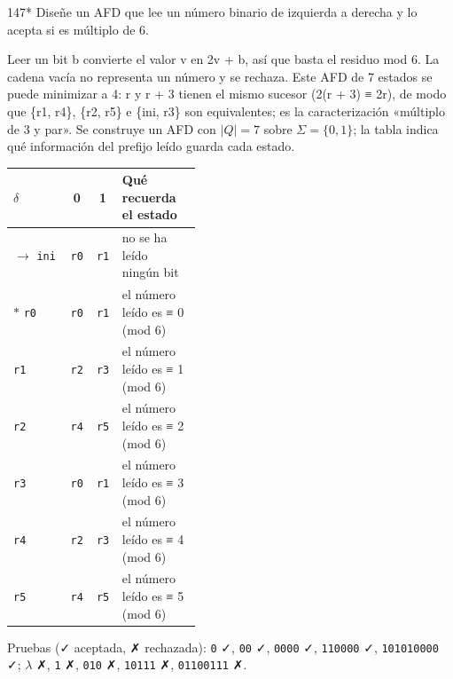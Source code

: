\documentclass[11pt]{article}
\begin{document}
\begin{ejercicio}{147}{*}
Diseñe un AFD que lee un número binario de izquierda a derecha y lo acepta si es múltiplo de 6.
\end{ejercicio}
\proc Leer un bit b convierte el valor v en 2v + b, así que basta el residuo mod 6. La cadena vacía no representa un número y se rechaza. Este AFD de 7 estados se puede minimizar a 4: r y r + 3 tienen el mismo sucesor (2(r + 3) ≡ 2r), de modo que \{r1, r4\}, \{r2, r5\} e \{ini, r3\} son equivalentes; es la caracterización «múltiplo de 3 y par». Se construye un AFD con $|Q| = 7$ sobre $\Sigma = \{0, 1\}$; la tabla indica qué información del prefijo leído guarda cada estado.
\begin{center}\small\begin{tabular}{lccp{0.42\linewidth}}\toprule
$\delta$ & 0 & 1 & Qué recuerda el estado \\\midrule
$\to$ \texttt{ini} & \texttt{r0} & \texttt{r1} & no se ha leído ningún bit \\
$*$ \texttt{r0} & \texttt{r0} & \texttt{r1} & el número leído es ≡ 0 (mod 6) \\
 \texttt{r1} & \texttt{r2} & \texttt{r3} & el número leído es ≡ 1 (mod 6) \\
 \texttt{r2} & \texttt{r4} & \texttt{r5} & el número leído es ≡ 2 (mod 6) \\
 \texttt{r3} & \texttt{r0} & \texttt{r1} & el número leído es ≡ 3 (mod 6) \\
 \texttt{r4} & \texttt{r2} & \texttt{r3} & el número leído es ≡ 4 (mod 6) \\
 \texttt{r5} & \texttt{r4} & \texttt{r5} & el número leído es ≡ 5 (mod 6) \\
\bottomrule\end{tabular}\end{center}
Pruebas (✓ aceptada, ✗ rechazada): \texttt{0} ✓, \texttt{00} ✓, \texttt{0000} ✓, \texttt{110000} ✓, \texttt{101010000} ✓; $\lambda$ ✗, \texttt{1} ✗, \texttt{010} ✗, \texttt{10111} ✗, \texttt{01100111} ✗.
\end{document}
